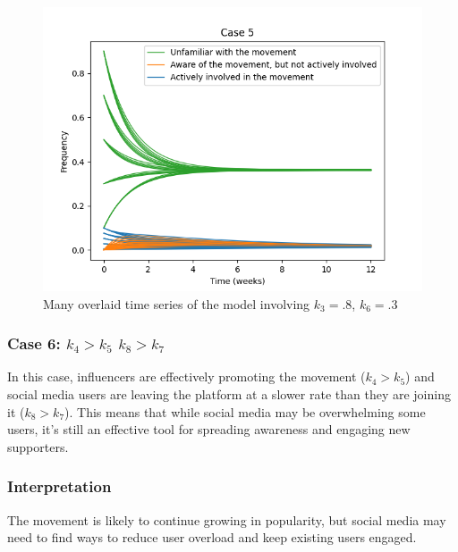 \documentclass{article}
\begin{document}
    \begin{figure}[H]

        \centering
        \includegraphics[width=\textwidth]{simulation/plots/case5.png}   
        \caption{Many overlaid time series of the model involving \mbox{$k_3=.8$}, \mbox{$k_6=.3$}}
        \label{fig:case5}
    \end{figure}


    \subsubsection*{Case 6: $k_4 > k_5$  $k_8 > k_7$}
    In this case, influencers are effectively promoting the movement ($k_4 > k_5$) and social media users are leaving the platform at a slower rate than they are joining it ($k_8 > k_7$). This means that while social media may be overwhelming some users, it's still an effective tool for spreading awareness and engaging new supporters.
    \subsubsection*{Interpretation}
    The movement is likely to continue growing in popularity, but social media may need to find ways to reduce user overload and keep existing users engaged.
\end{document}

